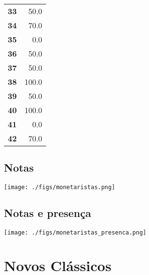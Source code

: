 \documentclass[11pt]{article}
\begin{document}
\begin{center}
\begin{longtable}{lr}
\textbf{33} &                  50.0 \\
\textbf{34} &                  70.0 \\
\textbf{35} &                   0.0 \\
\textbf{36} &                  50.0 \\
\textbf{37} &                  50.0 \\
\textbf{38} &                 100.0 \\
\textbf{39} &                  50.0 \\
\textbf{40} &                 100.0 \\
\textbf{41} &                   0.0 \\
\textbf{42} &                  70.0 \\
\end{longtable}
\end{center}

\subsection{Notas}
\label{sec:orgdfaf8ed}
\begin{center}
\texttt{[image: ./figs/monetaristas.png]}
\end{center}

\subsection{Notas e presença}
\label{sec:org9a210b3}

\begin{center}
\texttt{[image: ./figs/monetaristas\_presenca.png]}
\end{center}

\section{Novos Clássicos}
\label{sec:orgf8530c0}
\end{document}
